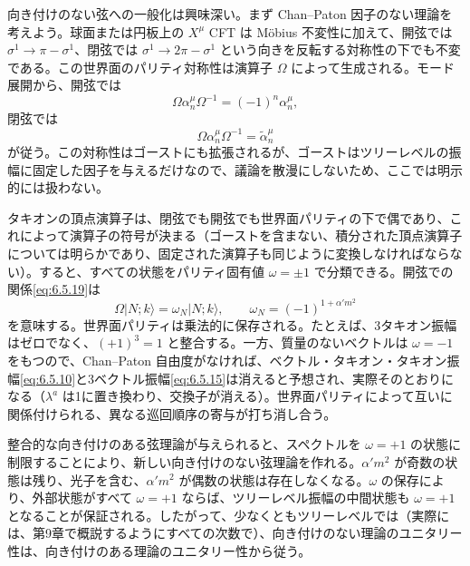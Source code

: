 
向き付けのない弦への一般化は興味深い。まず Chan--Paton 因子のない理論を考えよう。球面または円板上の $X^\mu$ CFT は Möbius 不変性に加えて、開弦では $\sigma^1\to\pi-\sigma^1$、閉弦では $\sigma^1\to2\pi-\sigma^1$ という向きを反転する対称性の下でも不変である。この世界面のパリティ対称性は演算子 $\Omega$ によって生成される。モード展開から、開弦では
\begin{equation}
\Omega\alpha^\mu_n\Omega^{-1}=(-1)^n\alpha^\mu_n,
\tag{6.5.19}\label{eq:6.5.19}
\end{equation}
閉弦では
\begin{equation}
\Omega\alpha^\mu_n\Omega^{-1}=\widetilde\alpha^\mu_n
\tag{6.5.20}\label{eq:6.5.20}
\end{equation}
が従う。この対称性はゴーストにも拡張されるが、ゴーストはツリーレベルの振幅に固定した因子を与えるだけなので、議論を散漫にしないため、ここでは明示的には扱わない。

タキオンの頂点演算子は、閉弦でも開弦でも世界面パリティの下で偶であり、これによって演算子の符号が決まる（ゴーストを含まない、積分された頂点演算子については明らかであり、固定された演算子も同じように変換しなければならない）。すると、すべての状態をパリティ固有値 $\omega=\pm1$ で分類できる。開弦での関係\eqref{eq:6.5.19}は
\begin{equation}
\Omega|N;k\rangle=\omega_N|N;k\rangle,
\qquad \omega_N=(-1)^{1+\alpha'm^2}
\tag{6.5.21}\label{eq:6.5.21}
\end{equation}
を意味する。世界面パリティは乗法的に保存される。たとえば、3タキオン振幅はゼロでなく、$(+1)^3=1$ と整合する。一方、質量のないベクトルは $\omega=-1$ をもつので、Chan--Paton 自由度がなければ、ベクトル・タキオン・タキオン振幅\eqref{eq:6.5.10}と3ベクトル振幅\eqref{eq:6.5.15}は消えると予想され、実際そのとおりになる（$\lambda^a$ は1に置き換わり、交換子が消える）。世界面パリティによって互いに関係付けられる、異なる巡回順序の寄与が打ち消し合う。

整合的な向き付けのある弦理論が与えられると、スペクトルを $\omega=+1$ の状態に制限することにより、新しい向き付けのない弦理論を作れる。$\alpha'm^2$ が奇数の状態は残り、光子を含む、$\alpha'm^2$ が偶数の状態は存在しなくなる。$\omega$ の保存により、外部状態がすべて $\omega=+1$ ならば、ツリーレベル振幅の中間状態も $\omega=+1$ となることが保証される。したがって、少なくともツリーレベルでは（実際には、第9章で概説するようにすべての次数で）、向き付けのない理論のユニタリー性は、向き付けのある理論のユニタリー性から従う。

